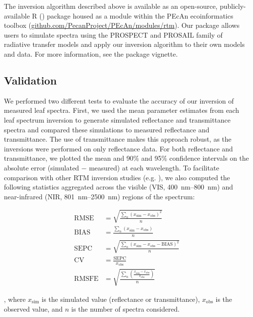 The inversion algorithm described above is available as an open-source,
publicly-available R (\cite{Rcore}) package housed as a module within the
PEcAn ecoinformatics toolbox
(\url{github.com/PecanProject/PEcAn/modules/rtm}). Our package allows users to
simulate spectra using the PROSPECT and PROSAIL family of radiative transfer
models and apply our inversion algorithm to their own models and data. For
more information, see the package vignette.


\subsection{Validation} \label{ss:m-validation}

We performed two different tests to evaluate the accuracy of our inversion of
measured leaf spectra. First, we used the mean parameter estimates from each
leaf spectrum inversion to generate simulated reflectance and transmittance
spectra and compared these simulations to measured reflectance and
transmittance. The use of transmittance makes this approach robust, as the
inversions were performed on only reflectance data. For both reflectance and
transmittance, we plotted the mean and 90\% and 95\% confidence intervals on
the absolute error (simulated $-$ measured) at each wavelength. To facilitate
comparison with other RTM inversion studies (e.g. \cite{Feret2008,
DiVittorio2009}), we also computed the following statistics aggregated across
the visible (VIS, \SIrange{400}{800}{\nano\meter}) and near-infrared (NIR,
\SIrange{801}{2500}{\nano\meter}) regions of the spectrum: 

\begin{align}
  \mathrm{RMSE} &= \sqrt{\frac{\sum_n{\left(x_{\mathrm{sim}} - x_{\mathrm{obs}} \right)^2}}{n}} \\
  \mathrm{BIAS} &= \frac{\sum_n{\left(x_{\mathrm{sim}} - x_{\mathrm{obs}} \right)}}{n} \\
  \mathrm{SEPC} &= \sqrt{\frac{\sum_n{\left(x_{\mathrm{sim}} - x_{\mathrm{obs}} - \mathrm{BIAS}\right)^2}}{n}} \\
  \mathrm{CV} &= \frac{\mathrm{SEPC}}{x_{\mathrm{obs}}} \\
  \mathrm{RMSFE} &= \sqrt{\frac{\sum_n{\left(\frac{x_{\mathrm{sim}} - x_{\mathrm{obs}}}{x_{\mathrm{obs}}}\right)}}{n}}
\end{align}

, where $x_{\mathrm{sim}}$ is the simulated value (reflectance or
transmittance), $x_{\mathrm{obs}}$ is the observed value, and $n$ is the
number of spectra considered.

